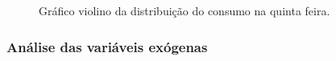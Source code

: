 \begin{center}
\begin{minipage}[c]{0.45\textwidth}
\begin{figure}[H]
{                	\caption{Gráfico violino da distribuição do consumo na quinta feira.} \label{fig:case1_violinplot_quinta} }
                \end{figure}\end{minipage} %
                        \begin{minipage}[c]{0.45\textwidth}
                \begin{figure}[H]
                \end{figure}
                \end{minipage} \end{center} 
            
    	    \subsubsection{Análise das variáveis exógenas}
